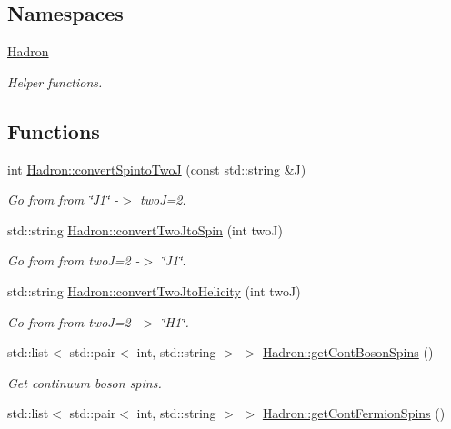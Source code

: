 \subsection*{Namespaces}
\begin{DoxyCompactItemize}
\item 
 \mbox{\hyperlink{namespaceHadron}{Hadron}}
\begin{DoxyCompactList}\small\item\em Helper functions. \end{DoxyCompactList}\end{DoxyCompactItemize}
\subsection*{Functions}
\begin{DoxyCompactItemize}
\item 
int \mbox{\hyperlink{namespaceHadron_acca1db731e7341c6fce2d78c3442c739}{Hadron\+::convert\+Spinto\+TwoJ}} (const std\+::string \&J)
\begin{DoxyCompactList}\small\item\em Go from from \char`\"{}\+J1\char`\"{} -\/$>$ twoJ=2. \end{DoxyCompactList}\item 
std\+::string \mbox{\hyperlink{namespaceHadron_a8593942e8f0063aaf40c4593dbb2cdbe}{Hadron\+::convert\+Two\+Jto\+Spin}} (int twoJ)
\begin{DoxyCompactList}\small\item\em Go from from twoJ=2 -\/$>$ \char`\"{}\+J1\char`\"{}. \end{DoxyCompactList}\item 
std\+::string \mbox{\hyperlink{namespaceHadron_a354d39c9f601a0a0f19857eb4b79a2d2}{Hadron\+::convert\+Two\+Jto\+Helicity}} (int twoJ)
\begin{DoxyCompactList}\small\item\em Go from from twoJ=2 -\/$>$ \char`\"{}\+H1\char`\"{}. \end{DoxyCompactList}\item 
std\+::list$<$ std\+::pair$<$ int, std\+::string $>$ $>$ \mbox{\hyperlink{namespaceHadron_a758e677215948a2af60fc6fee269d410}{Hadron\+::get\+Cont\+Boson\+Spins}} ()
\begin{DoxyCompactList}\small\item\em Get continuum boson spins. \end{DoxyCompactList}\item 
std\+::list$<$ std\+::pair$<$ int, std\+::string $>$ $>$ \mbox{\hyperlink{namespaceHadron_a7131ce7dd50310f2beeabb2a83dde484}{Hadron\+::get\+Cont\+Fermion\+Spins}} ()

\end{DoxyCompactItemize}
